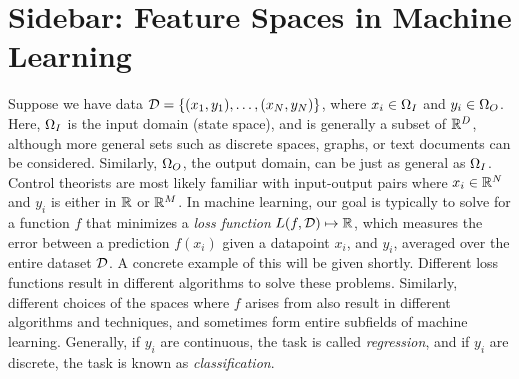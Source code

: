 \section[Feature Spaces in Machine Learning]{Sidebar: Feature Spaces in Machine Learning}\label{sb:featspace}
Suppose we have data $\mathcal{D} = \{(x_1,y_1), \dots, (x_{N},y_{N})\}$, where $x_i\in\Omega_I$ and $y_i\in\Omega_O$. Here, $\Omega_I$ is the input domain (state space), and 
is generally a subset of $\mathbb{R}^D$, although more general sets such as discrete spaces, graphs, or text documents can be considered.
Similarly, $\Omega_O$, the output domain, can be just as general as $\Omega_I$. Control theorists are most likely familiar with 
input-output pairs where $x_i\in\mathbb{R}^N$ and $y_i$ is either in $\mathbb{R}$ or $\mathbb{R}^M$. In machine learning, our goal is typically to solve for a function
$f$ that minimizes a \emph{loss function} $L(f, \mathcal{D})\mapsto\mathbb{R}$, which measures the error between a prediction $f(x_i)$ given a datapoint $x_i$, and $y_i$, averaged over the entire dataset $\mathcal{D}$. A concrete example of this will be given shortly.
Different loss functions result in different algorithms to solve these problems. Similarly, different choices of the spaces where $f$ arises from also 
result in different algorithms and techniques, and sometimes form entire subfields of machine learning. Generally, if $y_i$ are continuous, 
the task is called \emph{regression}, and if $y_i$ are discrete, the task is known as \emph{classification}. 

